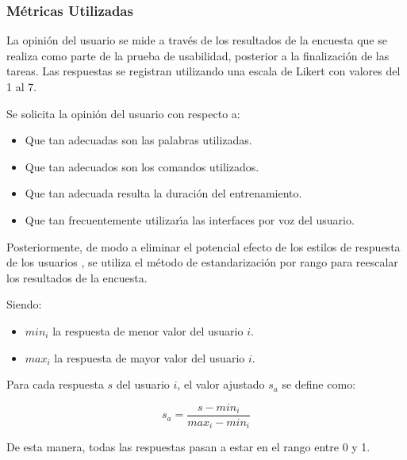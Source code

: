 \subsubsection{M\'etricas Utilizadas}
La opini\'on del usuario se mide a trav\'es de los resultados de la encuesta que se realiza como parte de
la prueba de usabilidad, posterior a la finalizaci\'on de las tareas. Las respuestas se
registran utilizando una escala de Likert \cite{Allen:2007} con valores del 1 al 7.

Se solicita la opini\'on del usuario con respecto a:
\begin{itemize}
	\item Que tan adecuadas son las palabras utilizadas.
	\item Que tan adecuados son los comandos utilizados.
	\item Que tan adecuada resulta la duraci\'on del entrenamiento.
	\item Que tan frecuentemente utilizar{\'\i}a las interfaces por voz del usuario.
\end{itemize}

Posteriormente, de modo a eliminar el potencial efecto de los estilos de respuesta
de los usuarios \cite{Fischer2010}, se utiliza el m\'etodo de estandarizaci\'on 
por rango \cite{Pagolu2011} para reescalar los resultados de la encuesta.

Siendo:
\begin{itemize}
	\item $min_i$ la respuesta de menor valor del usuario $i$.
	\item $max_i$ la respuesta de mayor valor del usuario $i$.
\end{itemize}

Para cada respuesta $s$ del usuario $i$, el valor ajustado $s_a$ se define como:

\begin{equation*}
s_a=\frac{s-min_i}{max_i-min_i}
\end{equation*}


De esta manera, todas las respuestas pasan a estar en el rango entre 0 y 1.  





